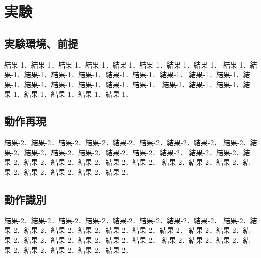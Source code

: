﻿%
\chapter{実験}

\section{実験環境、前提}

結果-1．結果-1．結果-1．結果-1．結果-1．結果-1．結果-1．結果-1．
結果-1．結果-1．結果-1．結果-1．結果-1．結果-1．結果-1．結果-1．
結果-1．結果-1．結果-1．結果-1．結果-1．結果-1．結果-1．結果-1．
結果-1．結果-1．結果-1．結果-1．結果-1．結果-1．結果-1．結果-1．


\section{動作再現}

結果-2．結果-2．結果-2．結果-2．結果-2．結果-2．結果-2．結果-2．
結果-2．結果-2．結果-2．結果-2．結果-2．結果-2．結果-2．結果-2．
結果-2．結果-2．結果-2．結果-2．結果-2．結果-2．結果-2．結果-2．
結果-2．結果-2．結果-2．結果-2．結果-2．結果-2．結果-2．結果-2．

\section{動作識別}

結果-2．結果-2．結果-2．結果-2．結果-2．結果-2．結果-2．結果-2．
結果-2．結果-2．結果-2．結果-2．結果-2．結果-2．結果-2．結果-2．
結果-2．結果-2．結果-2．結果-2．結果-2．結果-2．結果-2．結果-2．
結果-2．結果-2．結果-2．結果-2．結果-2．結果-2．結果-2．結果-2．
